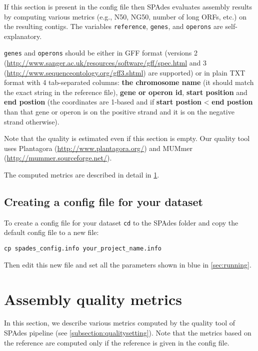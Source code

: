 \documentclass{article}
\def\spades{SPAdes}
\begin{document}
If this section is present in the config file then
{\spades} evaluates assembly results by computing various metrics (e.g., N50, NG50, number of long ORFs, etc.) on the resulting contigs.
The variables {\tt reference}, {\tt genes}, and {\tt operons} are self-explanatory.

{\tt genes} and {\tt operons} should be either in GFF format (versions 2 
(\url{http://www.sanger.ac.uk/resources/software/gff/spec.html} and 3 (\url{http://www.sequenceontology.org/gff3.shtml}) are supported) or in plain TXT format 
with 4 tab-separated columns: {\bf the chromosome name} (it should match the exact string in the reference file), {\bf gene or operon id}, {\bf start position} and
{\bf end postion} (the coordinates are 1-based and if {\bf start postion} < {\bf end postion} than that gene or operon is on the positive strand and it is on the negative strand otherwise).

Note that the quality is estimated even if this section is empty. Our quality tool uses Plantagora (\url{http://www.plantagora.org/}) and MUMmer (\url{http://mummer.sourceforge.net/}).

The computed metrics are described in detail in \cref{section:metrics}.

\subsection{Creating a config file for your dataset}
To create a config file for your dataset {\tt cd} to the {\spades} folder
and copy the default config file to a new file:
\begin{lstlisting}
cp spades_config.info your_project_name.info
\end{lstlisting}
Then edit this new file and set all the parameters
shown in blue in \cref{sec:running}.


\section{Assembly quality metrics}\label{section:metrics}
In this section, we describe various metrics computed by the quality tool
of {\spades} pipeline (see \cref{subsection:qualitysetting}). Note that 
the metrics based on the reference are computed only if the reference is given
in the config file.
\end{document}
